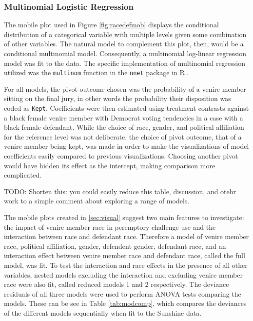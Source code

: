 \documentclass[12pt]{article}
\newcommand*{\R}{\textsf{R}$~$}
\newcommand{\TODO}[1]{{\color{brickred} TODO:  {#1}}}
\begin{document}
\subsubsection{Multinomial Logistic Regression}

The mobile plot used in Figure \ref{fig:racedefmob} displays the conditional distribution of a categorical variable with multiple levels given some combination of other variables. The natural model to complement this plot, then, would be a conditional multinomial model. Consequently, a multinomial log-linear regression model was fit to the data. The specific implementation of multinomial regression utilized was the \texttt{multinom} function in the \texttt{nnet} package in \R.

For all models, the pivot outcome chosen was the probability of a venire member sitting on the final jury, in other words the probability their disposition was coded as \texttt{Kept}. Coefficients were then estimated using treatment contrasts against a black female venire member with Democrat voting tendencies in a case with a black female defendant. While the choice of race, gender, and political affiliation for the reference level was not deliberate, the choice of pivot outcome, that of a venire member being kept, was made in order to make the visualizations of model coefficients easily compared to previous visualizations. Choosing another pivot would have hidden its effect as the intercept, making comparison more complicated.

\TODO{Shorten this: you could easily reduce this table, discussion, and otehr work to a simple comment about exploring a range of models.}

The mobile plots created in \ref{sec:visual} suggest two main features to investigate: the impact of venire member race in peremptory challenge use and the interaction between race and defendant race. Therefore a model of venire member race, political affiliation, gender, defendent gender, defendant race, and an interaction effect between venire member race and defendant race, called the full model, was fit. To test the interaction and race effects in the presence of all other variables, nested models excluding the interaction and excluding venire member race were also fit, called reduced models 1 and 2 respectively. The deviance residuals of all three models were used to perform ANOVA tests comparing the models. These can be see in Table \ref{tab:modcomp}, which compares the deviances of the different models sequentially when fit to the Sunshine data.
\end{document}
